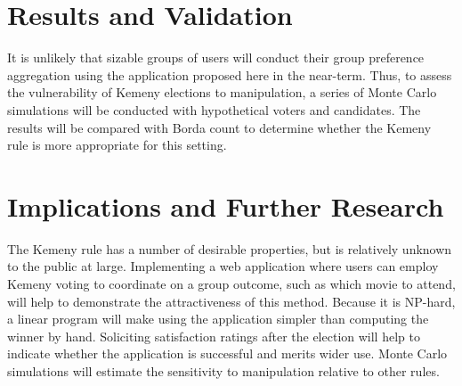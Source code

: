 \documentclass{article}
\begin{document}
\section{Results and Validation}


It is unlikely that sizable groups of users will conduct their group preference aggregation using the application proposed here in the near-term. Thus, to assess the vulnerability of Kemeny elections to manipulation, a series of Monte Carlo simulations will be conducted with hypothetical voters and candidates. The results will be compared with Borda count to determine whether the Kemeny rule is more appropriate for this setting.

\section{Implications and Further Research}

The Kemeny rule has a number of desirable properties, but is relatively unknown to the public at large. Implementing a web application where users can employ Kemeny voting to coordinate on a group outcome, such as which movie to attend, will help to demonstrate the attractiveness of this method. Because it is NP-hard, a linear program will make using the application simpler than computing the winner by hand. Soliciting satisfaction ratings after the election will help to indicate whether the application is successful and merits wider use. Monte Carlo simulations will estimate the sensitivity to manipulation relative to other rules. 

\begingroup
\renewcommand{\section}[2]{}


\endgroup
\end{document}
